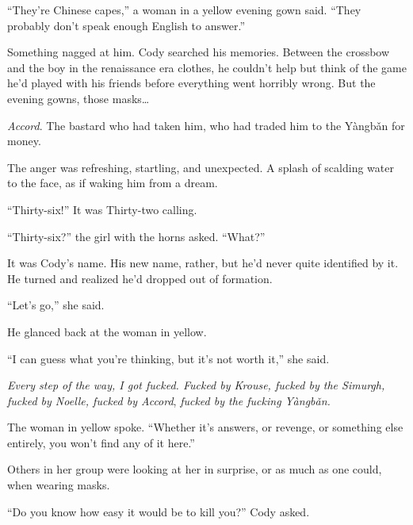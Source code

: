 ``They're Chinese capes,'' a woman in a yellow evening gown said.  ``They probably don't speak enough English to answer.''



Something nagged at him.  Cody searched his memories.  Between the crossbow and the boy in the renaissance era clothes, he couldn't help but think of the game he'd played with his friends before everything went horribly wrong.  But the evening gowns, those masks\ldots



\emph{Accord}.  The bastard who had taken him, who had traded him to the Y\`{a}ngb\v{a}n for money.



The anger was refreshing, startling, and unexpected.  A splash of scalding water to the face, as if waking him from a dream.



``Thirty-six!''  It was Thirty-two calling.



``Thirty-six?'' the girl with the horns asked.  ``What?''



It was Cody's name.  His new name, rather, but he'd never quite identified by it.  He turned and realized he'd dropped out of formation.



``Let's go,'' she said.



He glanced back at the woman in yellow.



``I can guess what you're thinking, but it's not worth it,'' she said.



\emph{Every step of the way, I got fucked.  Fucked by Krouse, fucked by the Simurgh, fucked by Noelle, fucked by Accord}, \emph{fucked by the fucking Y\`{a}ngb\v{a}n.}



The woman in yellow spoke.  ``Whether it's answers, or revenge, or something else entirely, you won't find any of it here.''



Others in her group were looking at her in surprise, or as much as one could, when wearing masks.



``Do you know how easy it would be to kill you?'' Cody asked.



